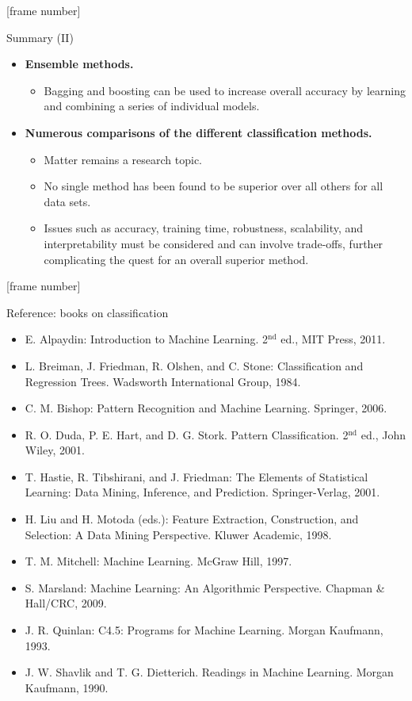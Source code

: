 \documentclass[aspectratio=169,t,table]{beamer}
\begin{document}
  {
    [frame number]
    \begin{frame}{Summary (II)}
        \begin{itemize}
          \item \textbf{Ensemble methods.}
          \begin{itemize}
            \item Bagging and boosting can be used to increase overall accuracy by learning and combining a series of individual models.
          \end{itemize}
          \item \textbf{Numerous comparisons of the different classification methods.}
          \begin{itemize}
            \item Matter remains a research topic.
            \item No single method has been found to be superior over all others for all data sets.
            \item Issues such as accuracy, training time, robustness, scalability, and interpretability must be considered and can involve trade-offs, further complicating the quest for an overall superior method.
          \end{itemize}
        \end{itemize}
    \end{frame}
  }

  {
    [frame number]
    \begin{frame}{Reference: books on classification}
      \begin{itemize}
        \item E. Alpaydin: Introduction to Machine Learning. 2$^\text{nd}$ ed., MIT Press, 2011.
        \item L. Breiman, J. Friedman, R. Olshen, and C. Stone: Classification and Regression Trees. Wadsworth International Group, 1984.
        \item C. M. Bishop: Pattern Recognition and Machine Learning. Springer, 2006.
        \item R. O. Duda, P. E. Hart, and D. G. Stork. Pattern Classification. 2$^\text{nd}$ ed., John Wiley, 2001.
        \item T. Hastie, R. Tibshirani, and J. Friedman: The Elements of Statistical Learning: Data Mining, Inference, and Prediction. Springer-Verlag, 2001.
        \item H. Liu and H. Motoda (eds.): Feature Extraction, Construction, and Selection: A Data Mining Perspective. Kluwer Academic, 1998.
        \item T. M. Mitchell: Machine Learning. McGraw Hill, 1997.
        \item S. Marsland: Machine Learning: An Algorithmic Perspective. Chapman \& Hall/CRC, 2009.
        \item \color{airforceblue} J. R. Quinlan: C4.5: Programs for Machine Learning. Morgan Kaufmann, 1993.
        \item J. W. Shavlik and T. G. Dietterich. Readings in Machine Learning. Morgan Kaufmann, 1990.
      \end{itemize}
    \end{frame}
  }
\end{document}
